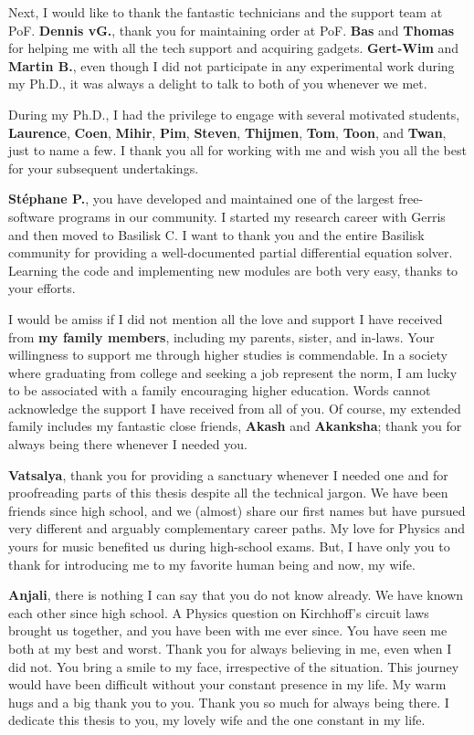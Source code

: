 Next, I would like to thank the fantastic technicians and the support team at PoF. {\bf Dennis vG.}, thank you for maintaining order at PoF. {\bf Bas} and {\bf Thomas} for helping me with all the tech support and acquiring gadgets. {\bf Gert-Wim} and {\bf Martin B.}, even though I did not participate in any experimental work during my Ph.D., it was always a delight to talk to both of you whenever we met. 

During my Ph.D., I had the privilege to engage with several motivated students, {\bf Laurence},  {\bf Coen}, {\bf Mihir}, {\bf Pim}, {\bf Steven}, {\bf Thijmen}, {\bf Tom}, {\bf Toon}, and {\bf Twan}, just to name a few. I thank you all for working with me and wish you all the best for your subsequent undertakings.

{\bf St{\'e}phane P.}, you have developed and maintained one of the largest free-software programs in our community. I started my research career with Gerris and then moved to Basilisk C. I want to thank you and the entire Basilisk community for providing a well-documented partial differential equation solver. Learning the code and implementing new modules are both very easy, thanks to your efforts.

I would be amiss if I did not mention all the love and support I have received from {\bf my family members}, including my parents, sister, and in-laws. Your willingness to support me through higher studies is commendable. In a society where graduating from college and seeking a job represent the norm, I am lucky to be associated with a family encouraging higher education. Words cannot acknowledge the support I have received from all of you. Of course, my extended family includes my fantastic close friends, {\bf Akash} and {\bf Akanksha}; thank you for always being there whenever I needed you. 

{\bf Vatsalya}, thank you for providing a sanctuary whenever I needed one and for proofreading parts of this thesis despite all the technical jargon. We have been friends since high school, and we (almost) share our first names but have pursued very different and arguably complementary career paths. My love for Physics and yours for music benefited us during high-school exams. But, I have only you to thank for introducing me to my favorite human being and now, my wife. 

{\bf Anjali}, there is nothing I can say that you do not know already. We have known each other since high school. A Physics question on Kirchhoff's circuit laws brought us together, and you have been with me ever since. You have seen me both at my best and worst. Thank you for always believing in me, even when I did not. You bring a smile to my face, irrespective of the situation. This journey would have been difficult without your constant presence in my life. My warm hugs and a big thank you to you. Thank you so much for always being there. I dedicate this thesis to you, my lovely wife and the one constant in my life. 

